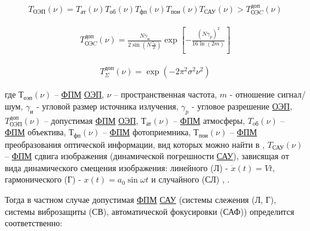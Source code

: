 \begin{equation}
\label{eq:p2:2.5}
\begin{alignedat}{2}
T_{\textit{ОЭП}}( \nu )=
T_{\textit{ат}}(\nu)T_{\textit{об}}(\nu)T_{\textit{фп}}(\nu)T_{\textit{пои}}(\nu)T_{\textit{САУ}}(\nu)>
T_{\textit{ОЭC}}^{\textit{доп}}(\nu)
\end{alignedat}
\end{equation}

\begin{equation}
\label{eq:p2:3}
\begin{alignedat}{2}
T_{\textit{ОЭC}}^{\textit{доп}}\left(\nu{}\right)=
\frac{N{\gamma{}}_\textit{и}}{2\sin{\left(N\frac{{\gamma{}}_\textit{и}}{2}\right)}}
\exp{\left[-\frac{{\left(N{\gamma{}}_p\right)}^2}{16\ln{\left(2m\right)}}\right]}
\end{alignedat}
\end{equation}

\begin{equation}
\label{eq:p2:4}
\begin{alignedat}{2}
T_{\Sigma{}}^{\textit{доп}}\left(\nu\right)=\exp{\left(-2{\pi{}}^2{\sigma{}}^2\nu^2\right)}
\end{alignedat}
\end{equation}

где 
$Т_{\textit{оэп}}(\nu)$ – \hyperref[acroFPM]{ФПМ} \hyperref[acroEOS]{ОЭП}, 
$\nu$ – пространственная частота, 
$m$ - отношение сигнал/шум, 
$\gamma_\textit{и}$ - угловой размер источника излучения, 
$\gamma_\textit{p}$ - угловое разрешение \hyperref[acroEOS]{ОЭП}, 
$T_{\textit{ОЭП}}^{\textit{доп}}(\nu)$ – допустимая \hyperref[acroFPM]{ФПМ} \hyperref[acroEOS]{ОЭП}, 
$Т_\textit{ат}(\nu)$ – \hyperref[acroFPM]{ФПМ} атмосферы, 
$T_\textit{oб}(\nu)$ – \hyperref[acroFPM]{ФПМ} объектива, 
$Т_\textit{фп}(\nu)$ – \hyperref[acroFPM]{ФПМ} фотоприемника, 
$Т_\textit{пои}(\nu)$ – \hyperref[acroFPM]{ФПМ} преобразования оптической информации, вид которых можно найти в \cite[]{Tarasov}, 
$T_{\textit{САУ}}(\nu)$ – \hyperref[acroFPM]{ФПМ} сдвига изображения (динамической погрешности \hyperref[acroSAU]{САУ}), зависящая от вида динамического смещения изображения: линейного (Л) - $\dot{x}(t) = Vt$, 
гармонического (Г) - $x(t)=a_{0}\sin{\omega t}$ и 
случайного (СЛ) \cite[]{Tarasov}, \cite[]{Sokolski22}.

Тогда в частном случае допустимая \hyperref[acroFPM]{ФПМ} \hyperref[acroSAU]{САУ} (системы слежения (Л, Г), системы виброзащиты (СВ), автоматической фокусировки (САФ)) определится соответственно: 

